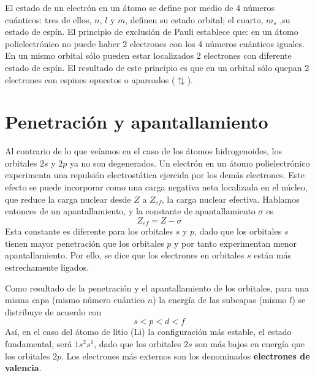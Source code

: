El estado de un electrón en un átomo
se define por medio de 4 números cuánticos: tres de ellos, $n$, $l$ y $m$, definen 
su estado orbital; el cuarto, $m_s$ ,su estado de espín.
El principio de exclusión de Pauli establece que: en un átomo polielectrónico
no puede haber 2 electrones con los 4 números cuánticos iguales.
En un mismo orbital sólo pueden estar localizados 2 electrones con diferente
estado de espín. El resultado de este principio es que en un orbital 
sólo quepan 2 electrones con espines opuestos o apareados ($\updownarrows$).

\section{Penetración y apantallamiento}
Al contrario de lo que veíamos en el caso de los átomos hidrogenoides,
los orbitales $2s$ y $2p$ ya no son degenerados. Un electrón en un 
átomo polielectrónico experimenta una repulsión electrostática 
ejercida por los demás electrones. Este efecto se puede incorporar
como una carga negativa neta localizada en el núcleo, que reduce la
carga nuclear desde $Z$ a $Z_{ef}$, la carga nuclear efectiva.
Hablamos entonces de un apantallamiento, y la constante de apantallamiento
$\sigma$ es 
\begin{equation}
    Z_{ef}= Z-\sigma
\end{equation}
Esta constante es diferente para los orbitales $s$ y $p$, dado
que los orbitales $s$ tienen mayor penetración que los orbitales
$p$ y por tanto experimentan menor apantallamiento. Por ello, 
se dice que los electrones en orbitales $s$ están más estrechamente
ligados.

Como resultado de la penetración y el apantallamiento de los orbitales,
para una misma capa (mismo número cuántico $n$) la energía de las 
subcapas (mismo $l$) se distribuye de acuerdo con
\begin{equation*}
    s<p<d<f
\end{equation*}
Así, en el caso del átomo de litio (Li) la configuración más
estable, el estado fundamental, será $1s^2s^1$, dado que los
orbitales $2s$ son más bajos en energía que los orbitales $2p$.
Los electrones más externos son los denominados \textbf{electrones 
de valencia}.


